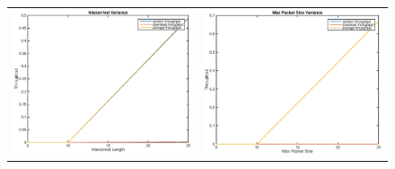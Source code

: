 \begin{figure}
\begin{tabular}{cc}
\includegraphics[scale=0.35]{../../src/fig-simulation_random_download-interarival-1_0_5_0_1_1_25.eps} & \includegraphics[scale=0.35]{../../src/fig-simulation_random_download-maxpackets-1_0_1_0_1_1_25.eps} \\

\end{tabular}
\end{figure}
